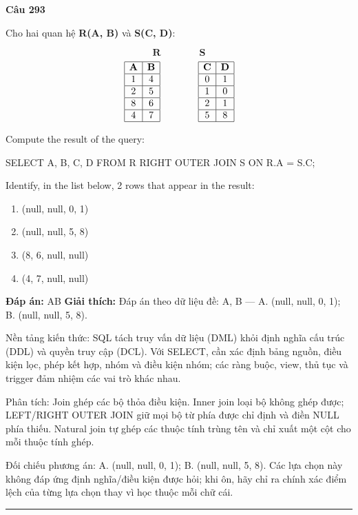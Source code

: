 \documentclass[11pt,a4paper]{article}
\newenvironment{question}[1]{%
  \par\vspace{1em}\noindent\textbf{\large Câu #1}\par\vspace{0.4em}
}{%
  \par\vspace{1em}\hrule\vspace{0.6em}
}
\newenvironment{choices}{%
  \begin{enumerate}[label=\textbf{\Alph*.},leftmargin=2.2em,itemsep=2pt,topsep=3pt]
}{%
  \end{enumerate}
}
\newcommand{\choice}{\item}
\newenvironment{codebox}{%
  \begin{tcolorbox}[colback=gray!8!white,colframe=gray!50!black,arc=1.5mm,boxrule=0.6pt,left=3mm,right=3mm,top=2.5mm,bottom=2.5mm]
  \ttfamily\small
}{%
  \end{tcolorbox}
}
\begin{document}
\begin{question}{293}
Cho hai quan hệ \textbf{R(A, B)} và \textbf{S(C, D)}:

$$\textbf{R} \qquad\qquad \textbf{S}$$
$$\begin{array}{|c|c|}
\hline
\textbf{A} & \textbf{B} \\
\hline
1 & 4 \\
\hline
2 & 5 \\
\hline
8 & 6 \\
\hline
4 & 7 \\
\hline
\end{array}
\qquad\qquad
\begin{array}{|c|c|}
\hline
\textbf{C} & \textbf{D} \\
\hline
0 & 1 \\
\hline
1 & 0 \\
\hline
2 & 1 \\
\hline
5 & 8 \\
\hline
\end{array}$$

Compute the result of the query:
\begin{codebox}
SELECT A, B, C, D
FROM R RIGHT OUTER JOIN S
ON R.A = S.C;
\end{codebox}
Identify, in the list below, 2 rows that appear in the result:
\begin{choices}
\choice (null, null, 0, 1)
\choice (null, null, 5, 8)
\choice (8, 6, null, null)
\choice (4, 7, null, null)
\end{choices}
\textbf{Đáp án:} AB
\textbf{Giải thích:} Đáp án theo dữ liệu đề: A, B — A. (null, null, 0, 1); B. (null, null, 5, 8).

Nền tảng kiến thức: SQL tách truy vấn dữ liệu (DML) khỏi định nghĩa cấu trúc (DDL) và quyền truy cập (DCL). Với SELECT, cần xác định bảng nguồn, điều kiện lọc, phép kết hợp, nhóm và điều kiện nhóm; các ràng buộc, view, thủ tục và trigger đảm nhiệm các vai trò khác nhau.

Phân tích: Join ghép các bộ thỏa điều kiện. Inner join loại bộ không ghép được; LEFT/RIGHT OUTER JOIN giữ mọi bộ từ phía được chỉ định và điền NULL phía thiếu. Natural join tự ghép các thuộc tính trùng tên và chỉ xuất một cột cho mỗi thuộc tính ghép.

Đối chiếu phương án: A. (null, null, 0, 1); B. (null, null, 5, 8). Các lựa chọn này không đáp ứng định nghĩa/điều kiện được hỏi; khi ôn, hãy chỉ ra chính xác điểm lệch của từng lựa chọn thay vì học thuộc mỗi chữ cái.
\end{question}
\end{document}
